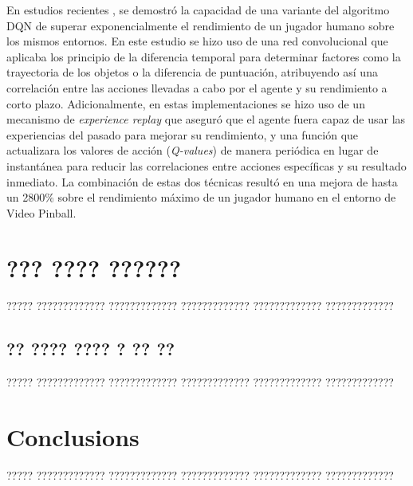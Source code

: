 \documentclass[11pt,spanish,listoffigures,listoftables]{tfgetsinf}
\begin{document}
En estudios recientes \cite{dqn}, se demostró la capacidad de una variante del algoritmo DQN de superar exponencialmente el rendimiento de un jugador humano sobre los mismos entornos. En este estudio se hizo uso de una red convolucional que aplicaba los principio de la diferencia temporal para determinar factores como la trayectoria de los objetos o la diferencia de puntuación, atribuyendo así una correlación entre las acciones llevadas a cabo por el agente y su rendimiento a corto plazo. Adicionalmente, en estas implementaciones se hizo uso de un mecanismo de \textit{experience replay} que aseguró que el agente fuera capaz de usar las experiencias del pasado para mejorar su rendimiento, y una función que actualizara los valores de acción (\textit{Q-values}) de manera periódica en lugar de instantánea para reducir las correlaciones entre acciones específicas y su resultado inmediato. La combinación de estas dos técnicas resultó en una mejora de hasta un 2800\% sobre el rendimiento máximo de un jugador humano en el entorno de Video Pinball. 

 









\chapter{??? ???? ??????}

????? ????????????? ????????????? ????????????? ????????????? ????????????? 

\section{?? ???? ???? ? ?? ??}

????? ????????????? ????????????? ????????????? ????????????? ?????????????


\chapter{Conclusions}

????? ????????????? ????????????? ????????????? ????????????? ????????????? 
\end{document}
